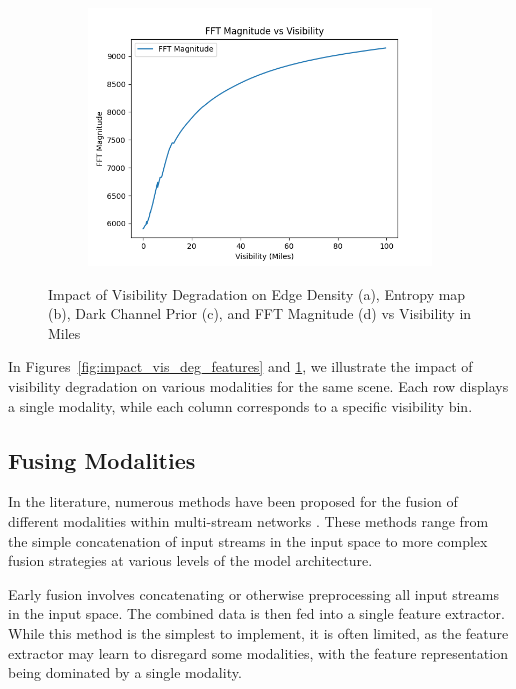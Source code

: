 \begin{figure}
\begin{subfigure}[b]{0.4\textwidth}
    \end{subfigure}
    \begin{subfigure}[b]{0.4\textwidth}
        \includegraphics[width=\textwidth]{imgs/fft_magnitude_vs_visibility.png}
    \end{subfigure}
    \caption{Impact of Visibility Degradation on Edge Density (a), Entropy map (b), Dark Channel Prior (c), and FFT Magnitude (d) vs Visibility in Miles}
    \label{fig:mean_of_features}
\end{figure}

 In Figures~\ref{fig:impact_vis_deg_features} and \ref{fig:mean_of_features}, we illustrate the impact of visibility degradation on various modalities for the same scene. Each row displays a single modality, while each column corresponds to a specific visibility bin.

\subsection{Fusing Modalities}

In the literature, numerous methods have been proposed for the fusion of different modalities within multi-stream networks \cite{akkus2023multimodal, radford2021learning, jia2021scaling}. These methods range from the simple concatenation of input streams in the input space to more complex fusion strategies at various levels of the model architecture.

Early fusion \cite{huang_fusion_2020} involves concatenating or otherwise preprocessing all input streams in the input space. The combined data is then fed into a single feature extractor. While this method is the simplest to implement, it is often limited, as the feature extractor may learn to disregard some modalities, with the feature representation being dominated by a single modality.

